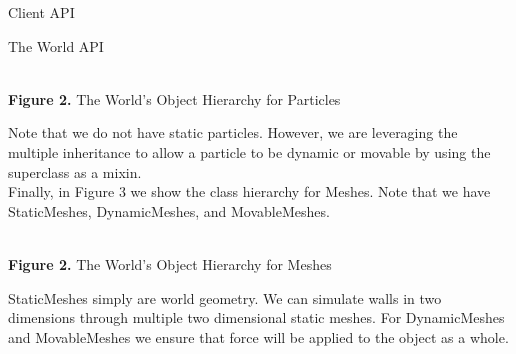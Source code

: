 \documentclass[11pt]{article}
\begin{document}
\begin{section}{Client API}
\begin{subsection}{The World API}
\begin{center}
\\[0.5cm]
\textbf{Figure 2.} The World's Object Hierarchy for Particles
\end{center}

Note that we do not have static particles. However, we are leveraging the multiple inheritance to allow a particle to be dynamic or movable by using the superclass as a mixin.\\

Finally, in Figure 3 we show the class hierarchy for Meshes. Note that we have StaticMeshes, DynamicMeshes, and MovableMeshes.

\begin{center}
\\[0.5cm]
\textbf{Figure 2.} The World's Object Hierarchy for Meshes
\end{center}
StaticMeshes simply are world geometry. We can simulate walls in two dimensions through multiple two dimensional static meshes. For DynamicMeshes and MovableMeshes we ensure that force will be applied to the object as a whole. \\


\end{subsection}
\end{section}
\end{document}
